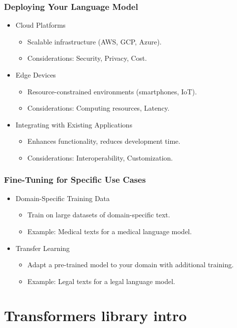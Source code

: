 \documentclass{beamer}
\begin{document}
\begin{frame}
\frametitle{Deploying Your Language Model}
\begin{itemize}
  \item Cloud Platforms
    \begin{itemize}
      \item Scalable infrastructure (AWS, GCP, Azure).
      \item Considerations: Security, Privacy, Cost.
    \end{itemize}
  \item Edge Devices
    \begin{itemize}
      \item Resource-constrained environments (smartphones, IoT).
      \item Considerations: Computing resources, Latency.
    \end{itemize}
  \item Integrating with Existing Applications
    \begin{itemize}
      \item Enhances functionality, reduces development time.
      \item Considerations: Interoperability, Customization.
    \end{itemize}
\end{itemize}
\end{frame}

\begin{frame}
\frametitle{Fine-Tuning for Specific Use Cases}
\begin{itemize}
  \item Domain-Specific Training Data
    \begin{itemize}
      \item Train on large datasets of domain-specific text.
      \item Example: Medical texts for a medical language model.
    \end{itemize}
  \item Transfer Learning
    \begin{itemize}
      \item Adapt a pre-trained model to your domain with additional training.
      \item Example: Legal texts for a legal language model.
    \end{itemize}
\end{itemize}
\end{frame}

\section{Transformers library intro}
\end{document}
